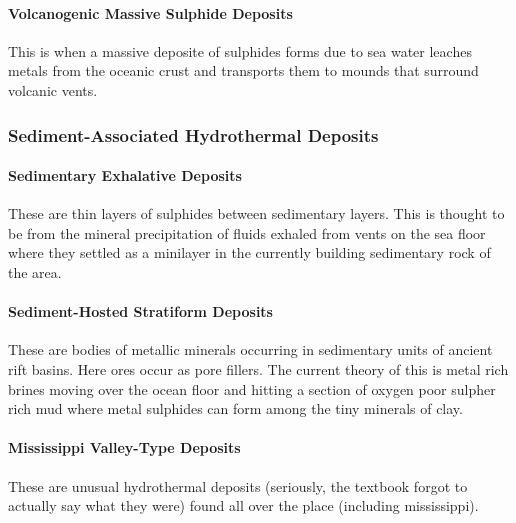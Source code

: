 \documentclass{article}
\begin{document}
\paragraph{Volcanogenic Massive Sulphide Deposits} %
\label{par:volcanogenic_massive_sulphide_deposits}
This is when a massive deposite of sulphides forms due to sea water leaches metals from the oceanic crust and transports them to mounds that surround volcanic vents.

\subsubsection{Sediment-Associated Hydrothermal Deposits} %
\label{sub:sedmient_associated_hydrothermal_deposits}

\paragraph{Sedimentary Exhalative Deposits} %
\label{par:sedimentary_exhalative_deposits}
These are thin layers of sulphides between sedimentary layers. This is thought to be from the mineral precipitation of fluids exhaled from vents on the sea floor where they settled as a minilayer in the currently building sedimentary rock of the area.

\paragraph{Sediment-Hosted Stratiform Deposits} %
\label{par:sediment_hosted_stratiform_deposits}
These are bodies of metallic minerals occurring in sedimentary units of ancient rift basins. Here ores occur as pore fillers. The current theory of this is metal rich brines moving over the ocean floor and hitting a section of oxygen poor sulpher rich mud where metal sulphides can form among the tiny minerals of clay.

\paragraph{Mississippi Valley-Type Deposits} %
\label{par:mississippi_valley_type_deposits}
These are unusual hydrothermal deposits (seriously, the textbook forgot to actually say what they were) found all over the place (including mississippi).
\end{document}
